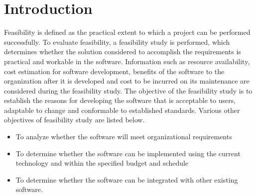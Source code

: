 \documentclass[fleqn,10pt]{../SelfArx} %
\affiliation{\textit{D-Enigma (Group - CS 01)}} %
\affiliation{\textit{Indian Institute of Information Technology, Vadodara.}} %
\begin{document}
\sffamily
\flushbottom %

\maketitle %

\tableofcontents %

\thispagestyle{empty} %


\section*{Introduction} %
Feasibility is defined as the practical extent to which a project can be performed successfully. To evaluate feasibility, a feasibility study is performed, which determines whether the solution considered to accomplish the requirements is practical and workable in the software. Information such as resource availability, cost estimation for software development, benefits of the software to the organization after it is developed and cost to be incurred on its maintenance are considered during the feasibility study. The objective of the feasibility study is to establish the reasons for developing the software that is acceptable to users, adaptable to change and conformable to established standards. Various other objectives of feasibility study are listed below.
\begin{itemize}

\item To analyze whether the software will meet organizational requirements
\item To determine whether the software can be implemented using the current technology and within the specified budget and schedule
\item To determine whether the software can be integrated with other existing software. \end{itemize}
\end{document}
